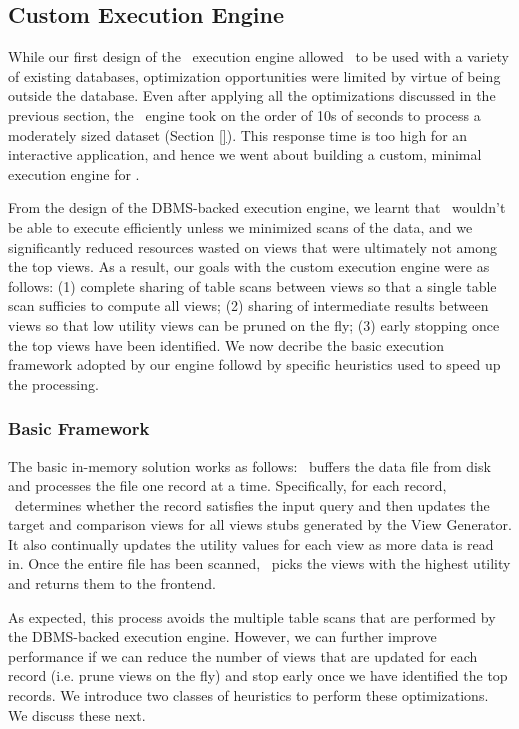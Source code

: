 \subsection{Custom Execution Engine}
\label{sec:in_memory_execution_engine}

While our first design of the \SeeDB\ execution engine allowed \SeeDB\ to be
used with a variety of existing databases, optimization opportunities were
limited by virtue of being outside the database.
Even after applying all the optimizations discussed in the previous section, the
\SeeDB\ engine took on the order of 10s of seconds to process a
moderately sized dataset (Section \ref{}).
This response time is too high for an interactive application, and hence we
went about building a custom, minimal execution engine for \SeeDB.

From the design of the DBMS-backed execution engine, we learnt that \SeeDB\
wouldn't be able to execute efficiently unless we minimized scans of the data,
and we significantly reduced resources wasted on views
that were ultimately not among the top views.
As a result, our goals with the custom execution engine were as follows:
(1) complete sharing of table scans between views so that a single table scan
sufficies to compute all views; 
(2) sharing of intermediate results between views so that low utility views can
be pruned on the fly; 
(3) early stopping once the top views have been identified. 
We now decribe the
basic execution framework adopted by our engine followd by specific heuristics
used to speed up the processing.

\subsubsection{Basic Framework}
\label{subsec:basic_framework}
The basic in-memory solution works as follows: \SeeDB\ buffers the data file
from disk and processes the file one record at a time. Specifically, for each
record, \SeeDB\ determines whether the record satisfies the input query and then
updates the target and comparison views for all views stubs generated by the
View Generator. It also continually updates the utility values for each view as
more data is read in. Once the entire file has been scanned, \SeeDB\ picks the
views with the highest utility and returns them to the frontend.

As expected, this process avoids the multiple table scans that are performed by
the DBMS-backed execution engine. 
However, we can further improve performance if we can reduce the number of views
that are updated for each record (i.e. prune views on the fly) and stop early
once we have identified the top records. 
We introduce two classes of heuristics to perform these optimizations.
We discuss these next.

